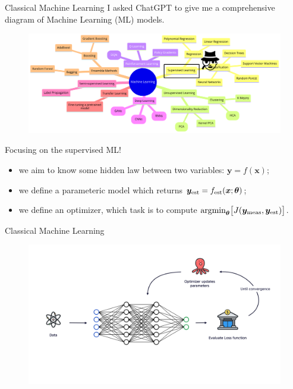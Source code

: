 \documentclass[aspectratio=169, 8pt, xcolor={svgnames}, hyperref={linkcolor=black}]{beamer}
\begin{document}
\begin{frame}{Classical Machine Learning}
I asked ChatGPT to give me a comprehensive diagram of Machine Learning (ML) models.
\begin{figure}
   \includegraphics[width=0.7\linewidth, height=0.5\textheight]{figures/supervised.png}
\end{figure}  
Focusing on the supervised ML!
\begin{itemize}[noitemsep]
\item[\faCrosshairs] we aim to know some hidden law between two variables: $\bm{y}=f(\bm{x})$;
\item[\faBarChart] we define a parameteric model which returns $\bm{y}_{\rm est}=f_{\rm est}(\bm{x}; \bm{\theta})$;
\item[\faBinoculars] we define an optimizer, which task is to compute 
   $\text{argmin}_{\bm{\theta}}\bigl[J(\bm{y}_{\rm meas}, \bm{y}_{\rm est})\bigr]$.
\end{itemize}
\end{frame}

\begin{frame}{Classical Machine Learning}
\begin{figure}
   \includegraphics[width=1\linewidth]{figures/ml_scheme.png}
\end{figure}  
\end{frame}
\end{document}
